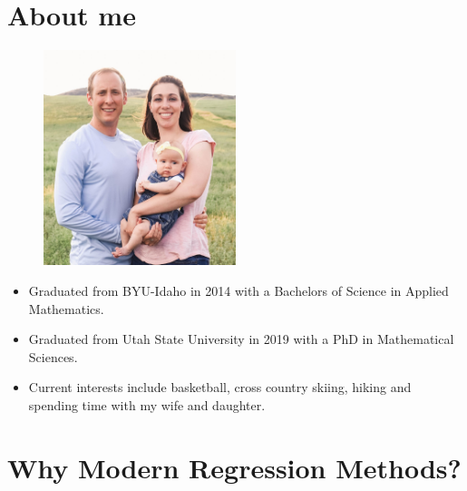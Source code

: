 \documentclass[12pt]{notes}
\begin{document}

\section{About me}

\begin{figure}[H]
\centering
\includegraphics[width=0.5\textwidth]{figures/module1/family.jpg}
\end{figure}

\begin{itemize}
\item Graduated from BYU-Idaho in 2014 with a Bachelors of Science in Applied Mathematics.
\item Graduated from Utah State University in 2019 with a PhD in Mathematical Sciences.
\item Current interests include basketball, cross country skiing, hiking and spending time with my wife and daughter.
\end{itemize}



\begin{minipage}[l][2cm][c]{\textwidth}

\end{minipage}

\section{Why Modern Regression Methods?}
\end{document}
